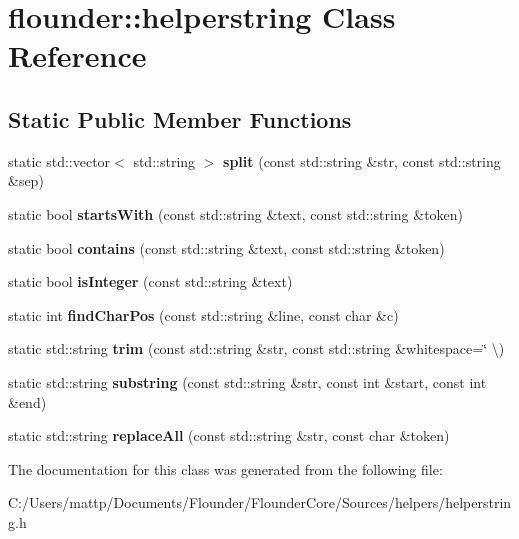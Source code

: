 \hypertarget{classflounder_1_1helperstring}{}\section{flounder\+:\+:helperstring Class Reference}
\label{classflounder_1_1helperstring}
\subsection*{Static Public Member Functions}
\begin{DoxyCompactItemize}
\item 
\mbox{\label{classflounder_1_1helperstring_a06fd29db727eba0d787e309528f323e7}} 
static std\+::vector$<$ std\+::string $>$ {\bfseries split} (const std\+::string \&str, const std\+::string \&sep)
\item 
\mbox{\label{classflounder_1_1helperstring_acc8b073561b5c531e8299a8a15328ea8}} 
static bool {\bfseries starts\+With} (const std\+::string \&text, const std\+::string \&token)
\item 
\mbox{\label{classflounder_1_1helperstring_a4a129c689fac1c9a43c4b4979c633783}} 
static bool {\bfseries contains} (const std\+::string \&text, const std\+::string \&token)
\item 
\mbox{\label{classflounder_1_1helperstring_a5e26e50f632ef7f82dbd7d57e4d532cd}} 
static bool {\bfseries is\+Integer} (const std\+::string \&text)
\item 
\mbox{\label{classflounder_1_1helperstring_ac93333ff22f541648d9ceaddba00a712}} 
static int {\bfseries find\+Char\+Pos} (const std\+::string \&line, const char \&c)
\item 
\mbox{\label{classflounder_1_1helperstring_a5398a40db12d52aebe7816643a6c3ce8}} 
static std\+::string {\bfseries trim} (const std\+::string \&str, const std\+::string \&whitespace=\char`\"{} \textbackslash{})
\item 
\mbox{\label{classflounder_1_1helperstring_a56efb1e2a2153b52a537c27749eeb608}} 
static std\+::string {\bfseries substring} (const std\+::string \&str, const int \&start, const int \&end)
\item 
\mbox{\label{classflounder_1_1helperstring_aab301f1cfdb30a22c213e42c4dd9af89}} 
static std\+::string {\bfseries replace\+All} (const std\+::string \&str, const char \&token)
\end{DoxyCompactItemize}


The documentation for this class was generated from the following file\+:\begin{DoxyCompactItemize}
\item 
C\+:/\+Users/mattp/\+Documents/\+Flounder/\+Flounder\+Core/\+Sources/helpers/helperstring.\+h\end{DoxyCompactItemize}
